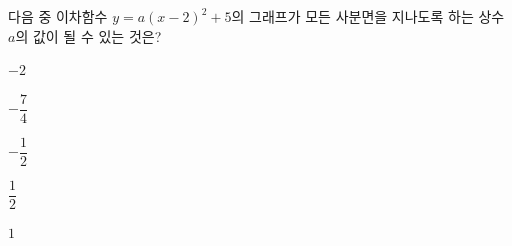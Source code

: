 다음 중 이차함수 $y=a(x-2)^2+5$의 그래프가 모든 사분면을 지나도록 하는 상수 $a$의 값이 될 수 있는 것은?
\begin{choices32}{\rule[-3ex]{0pt}{8ex}$-2$}{\rule[-3ex]{0pt}{8ex}$-\dfrac{7}{4}$}{\rule[-3ex]{0pt}{8ex}$-\dfrac{1}{2}$}{\rule[-3ex]{0pt}{8ex}$\dfrac{1}{2}$}{\rule[-3ex]{0pt}{8ex}$1$}\end{choices32}
